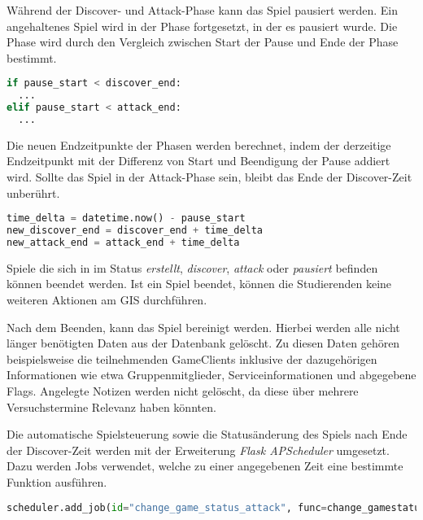 Während der Discover- und Attack-Phase kann das Spiel pausiert werden. Ein angehaltenes Spiel wird in der Phase fortgesetzt, in der es pausiert wurde. Die Phase wird durch den Vergleich zwischen Start der Pause und Ende der Phase bestimmt.

\begin{lstlisting}[language=Python, frame=single, caption={GIS Spiel fortsetzen}, captionpos=b, label={lst:gis-resume-game}]
if pause_start < discover_end:
  ...
elif pause_start < attack_end:
  ...
\end{lstlisting}

Die neuen Endzeitpunkte der Phasen werden berechnet, indem der derzeitige Endzeitpunkt mit der Differenz von Start und Beendigung der Pause addiert wird. Sollte das Spiel in der Attack-Phase sein, bleibt das Ende der Discover-Zeit unberührt.

\begin{lstlisting}[language=Python, frame=single, caption={GIS Spiel fortsezen}, captionpos=b, label={lst:gis-pause-add-time}]
time_delta = datetime.now() - pause_start
new_discover_end = discover_end + time_delta
new_attack_end = attack_end + time_delta
\end{lstlisting}

Spiele die sich in im Status \textit{erstellt}, \textit{discover}, \textit{attack} oder \textit{pausiert} befinden können beendet werden. Ist ein Spiel beendet, können die Studierenden keine weiteren Aktionen am GIS durchführen.

Nach dem Beenden, kann das Spiel bereinigt werden. Hierbei werden alle nicht länger benötigten Daten aus der Datenbank gelöscht. Zu diesen Daten gehören beispielsweise die teilnehmenden GameClients inklusive der dazugehörigen Informationen wie etwa Gruppenmitglieder, Serviceinformationen und abgegebene Flags. Angelegte Notizen werden nicht gelöscht, da diese über mehrere Versuchstermine Relevanz haben könnten.

Die automatische Spielsteuerung sowie die Statusänderung des Spiels nach Ende der Discover-Zeit werden mit der Erweiterung \textit{Flask APScheduler} umgesetzt. Dazu werden Jobs verwendet, welche zu einer angegebenen Zeit eine bestimmte Funktion ausführen.

\begin{lstlisting}[language=Python, frame=single, caption={GIS Scheduler Jobs}, captionpos=b, label={lst:gis-scheduler-jobs}]
scheduler.add_job(id="change_game_status_attack", func=change_gamestatus, trigger='date', run_date=discover_end_datetime)
\end{lstlisting}

